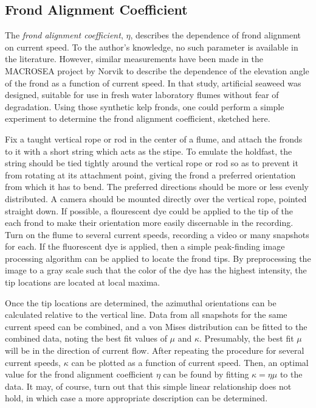 \subsection{Frond Alignment Coefficient}
The \textit{frond alignment coefficient}, $\eta$, describes the dependence of frond alignment on current speed.
To the author's knowledge, no such parameter is available in the literature.
However, similar measurements have been made in the MACROSEA project by Norvik \cite{norvik_design_2017} to describe
the dependence of the elevation angle of the frond as a function of current speed.
In that study, artificial seaweed was designed, suitable for use in fresh water laboratory flumes without fear of degradation.
Using those synthetic kelp fronds, one could perform a simple experiment to determine the frond alignment coefficient, sketched here.

Fix a taught vertical rope or rod in the center of a flume, and attach the fronds to it with a short string which acts as the stipe.
To emulate the holdfast, the string should be tied tightly around the vertical rope or rod so as to prevent it from rotating at its attachment point,
giving the frond a preferred orientation from which it has to bend.
The preferred directions should be more or less evenly distributed.
A camera should be mounted directly over the vertical rope, pointed straight down.
If possible, a flourescent dye could be applied to the tip of the each frond to make their orientation more easily discernable in the recording.
Turn on the flume to several current speeds, recording a video or many snapshots for each.
If the fluorescent dye is applied, then a simple peak-finding image processing algorithm can be applied to locate the frond tips.
By preprocessing the image to a gray scale such that the color of the dye has the highest intensity,
the tip locations are located at local maxima.

Once the tip locations are determined, the azimuthal orientations can be calculated relative to the vertical line.
Data from all snapshots for the same current speed can be combined, and a von Mises distribution can be fitted to the combined data,
noting the best fit values of $\mu$ and $\kappa$.
Presumably, the best fit $\mu$ will be in the direction of current flow.
After repeating the procedure for several current speeds, $\kappa$ can be plotted as a function of current speed.
Then, an optimal value for the frond alignment coefficient $\eta$ can be found by fitting $\kappa = \eta\mu$ to the data.
It may, of course, turn out that this simple linear relationship does not hold, in which case a more appropriate description can be determined.


